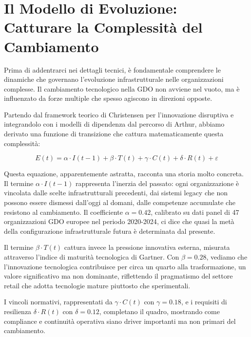 \documentclass[12pt,a4paper,twoside]{book}
\begin{document}
\section{Il Modello di Evoluzione: Catturare la Complessità del Cambiamento}

Prima di addentrarci nei dettagli tecnici, è fondamentale comprendere le dinamiche che governano l'evoluzione infrastrutturale nelle organizzazioni complesse. Il cambiamento tecnologico nella GDO non avviene nel vuoto, ma è influenzato da forze multiple che spesso agiscono in direzioni opposte.

Partendo dal framework teorico di Christensen per l'innovazione disruptiva\autocite{christensen2023} e integrandolo con i modelli di dipendenza dal percorso di Arthur\autocite{arthur2024}, abbiamo derivato una funzione di transizione che cattura matematicamente questa complessità:

\begin{equation}
E(t) = \alpha \cdot I(t-1) + \beta \cdot T(t) + \gamma \cdot C(t) + \delta \cdot R(t) + \varepsilon
\label{eq:evolution_model}
\end{equation}

Questa equazione, apparentemente astratta, racconta una storia molto concreta. Il termine $\alpha \cdot I(t-1)$ rappresenta l'inerzia del passato: ogni organizzazione è vincolata dalle scelte infrastrutturali precedenti, dai sistemi legacy che non possono essere dismessi dall'oggi al domani, dalle competenze accumulate che resistono al cambiamento. Il coefficiente $\alpha = 0.42$, calibrato su dati panel di 47 organizzazioni GDO europee nel periodo 2020-2024\autocite{eurostat2024}, ci dice che quasi la metà della configurazione infrastrutturale futura è determinata dal presente.

Il termine $\beta \cdot T(t)$ cattura invece la pressione innovativa esterna, misurata attraverso l'indice di maturità tecnologica di Gartner\autocite{gartner2024hype}. Con $\beta = 0.28$, vediamo che l'innovazione tecnologica contribuisce per circa un quarto alla trasformazione, un valore significativo ma non dominante, riflettendo il pragmatismo del settore retail che adotta tecnologie mature piuttosto che sperimentali.

I vincoli normativi, rappresentati da $\gamma \cdot C(t)$ con $\gamma = 0.18$, e i requisiti di resilienza $\delta \cdot R(t)$ con $\delta = 0.12$, completano il quadro, mostrando come compliance e continuità operativa siano driver importanti ma non primari del cambiamento.
\end{document}
